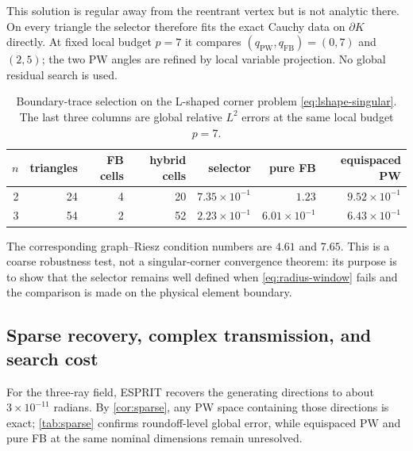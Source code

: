 \documentclass[11pt]{article}
\newcommand{\PW}{\mathrm{PW}}
\newcommand{\FB}{\mathrm{FB}}
\numberwithin{equation}{section}
\begin{document}
This solution is regular away from the reentrant vertex but is not analytic there.  On every triangle the selector therefore fits the exact Cauchy data on $\partial K$ directly.  At fixed local budget $p=7$ it compares $(q_{\PW},q_{\FB})=(0,7)$ and $(2,5)$; the two PW angles are refined by local variable projection.  No global residual search is used.
\begin{table}[htbp]
\centering
\caption{Boundary-trace selection on the L-shaped corner problem \eqref{eq:lshape-singular}.  The last three columns are global relative $L^2$ errors at the same local budget $p=7$.}
\label{tab:lshape-boundary}
\footnotesize
\begin{tabular}{rrrrrrr}
\toprule
$n$ & triangles & FB cells & hybrid cells & selector & pure FB & equispaced PW\\
\midrule
2 & 24 & 4 & 20 & $7.35\times10^{-1}$ & $1.23$ & $9.52\times10^{-1}$\\
3 & 54 & 2 & 52 & $2.23\times10^{-1}$ & $6.01\times10^{-1}$ & $6.43\times10^{-1}$\\
\bottomrule
\end{tabular}
\end{table}
The corresponding graph--Riesz condition numbers are $4.61$ and $7.65$.  This is a coarse robustness test, not a singular-corner convergence theorem: its purpose is to show that the selector remains well defined when \eqref{eq:radius-window} fails and the comparison is made on the physical element boundary.

\subsection{Sparse recovery, complex transmission, and search cost}
For the three-ray field, ESPRIT recovers the generating directions to about $3\times10^{-11}$ radians.  By \cref{cor:sparse}, any PW space containing those directions is exact; \cref{tab:sparse} confirms roundoff-level global error, while equispaced PW and pure FB at the same nominal dimensions remain unresolved.
\end{document}
